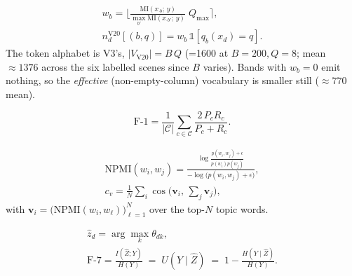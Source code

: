 \begin{equation}\label{eq:v20}
\begin{gathered}
w_b=\Big\lfloor \tfrac{\mathrm{MI}(x_{\cdot b};\,y)}{\max_{b'}\mathrm{MI}(x_{\cdot b'};\,y)}\;Q_{\max}\Big\rceil,
\\
n_d^{\mathrm{V20}}[(b,q)] = w_b\,\mathds{1}\!\left[q_b(x_d)=q\right].
\end{gathered}
\end{equation}
The token alphabet is V3's, $|V_{\mathrm{V20}}|=B\,Q$ (=1600 at
$B=200,Q=8$; mean $\approx 1376$ across the six labelled scenes since
$B$ varies). Bands with $w_b=0$ emit nothing, so the \emph{effective}
(non-empty-column) vocabulary is smaller still ($\approx 770$ mean).


\begin{equation}\label{eq:f1}
\mathrm{F\text{-}1}=\frac{1}{|\mathcal{C}|}\sum_{c\in\mathcal{C}}
\frac{2\,P_c R_c}{P_c+R_c}.
\end{equation}

\begin{equation}\label{eq:f2}
\begin{gathered}
\mathrm{NPMI}(w_i,w_j)=\frac{\log\frac{p(w_i,w_j)+\epsilon}{p(w_i)p(w_j)}}{-\log\big(p(w_i,w_j)+\epsilon\big)},\\
c_v=\frac{1}{N}\sum_{i}\cos\!\big(\mathbf{v}_i,\,\textstyle\sum_j \mathbf{v}_j\big),
\end{gathered}
\end{equation}
with $\mathbf{v}_i=\big(\mathrm{NPMI}(w_i,w_\ell)\big)_{\ell=1}^{N}$ over the
top-$N$ topic words.

\begin{equation}\label{eq:f7}
\begin{gathered}
\hat{z}_d=\arg\max_k \theta_{dk},\\
\mathrm{F\text{-}7}=\frac{I(\hat{Z};Y)}{H(Y)}
\;=\; U(Y\mid\hat{Z})\;=\;1-\frac{H(Y\mid\hat{Z})}{H(Y)}.
\end{gathered}
\end{equation}

